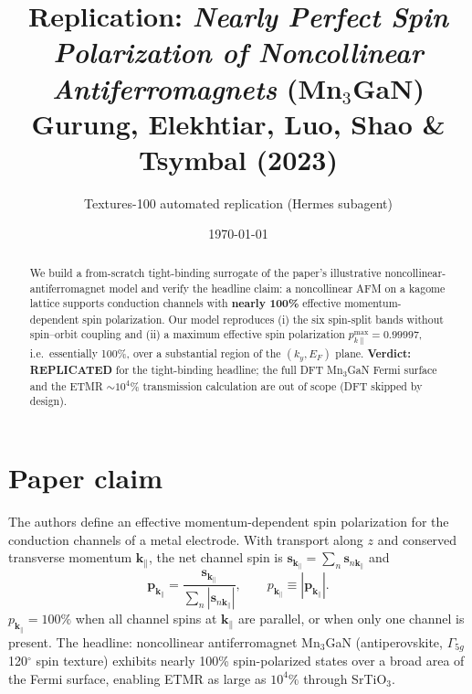 \documentclass[11pt]{article}
\title{Replication: \emph{Nearly Perfect Spin Polarization of Noncollinear Antiferromagnets} (Mn$_3$GaN)\\ \large Gurung, Elekhtiar, Luo, Shao \& Tsymbal (2023)}
\author{Textures-100 automated replication (Hermes subagent)}
\date{\today}
\begin{document}
\maketitle

\begin{abstract}
We build a from-scratch tight-binding surrogate of the paper's illustrative
noncollinear-antiferromagnet model and verify the headline claim: a noncollinear
AFM on a kagome lattice supports conduction channels with \textbf{nearly 100\%}
effective momentum-dependent spin polarization. Our model reproduces (i) the
six spin-split bands without spin--orbit coupling and (ii) a maximum effective
spin polarization $p_{k\parallel}^{\max}=0.99997$, i.e.\ essentially 100\%,
over a substantial region of the $(k_y,E_F)$ plane. \textbf{Verdict: REPLICATED}
for the tight-binding headline; the full DFT Mn$_3$GaN Fermi surface and the
ETMR $\sim10^4\%$ transmission calculation are out of scope (DFT skipped by design).
\end{abstract}

\section{Paper claim}
The authors define an effective momentum-dependent spin polarization for the
conduction channels of a metal electrode. With transport along $z$ and conserved
transverse momentum $\mathbf{k}_\parallel$, the net channel spin is
$\mathbf{s}_{\mathbf{k}_\parallel}=\sum_n \mathbf{s}_{n\mathbf{k}_\parallel}$ and
\begin{equation}
\mathbf{p}_{\mathbf{k}_\parallel}=\frac{\mathbf{s}_{\mathbf{k}_\parallel}}
{\sum_n |\mathbf{s}_{n\mathbf{k}_\parallel}|},\qquad
p_{\mathbf{k}_\parallel}\equiv|\mathbf{p}_{\mathbf{k}_\parallel}|.
\tag{Eq.~2}
\end{equation}
$p_{\mathbf{k}_\parallel}=100\%$ when all channel spins at $\mathbf{k}_\parallel$
are parallel, or when only one channel is present. The headline: noncollinear
antiferromagnet Mn$_3$GaN (antiperovskite, $\Gamma_{5g}$ 120$^\circ$ spin texture)
exhibits nearly 100\% spin-polarized states over a broad area of the Fermi surface,
enabling ETMR as large as $10^4\%$ through SrTiO$_3$.
\end{document}
